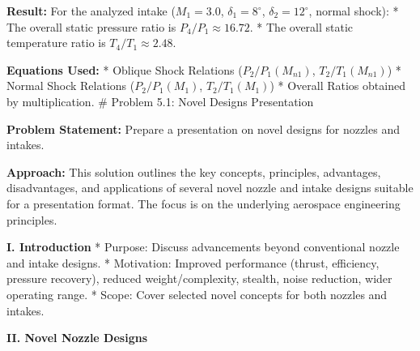 \textbf{Result:} For the analyzed intake (\(M_1=3.0\),
\(\delta_1=8^\circ\), \(\delta_2=12^\circ\), normal shock): * The
overall static pressure ratio is \(P_4/P_1 \approx \mathbf{16.72}\). *
The overall static temperature ratio is
\(T_4/T_1 \approx \mathbf{2.48}\).

\textbf{Equations Used:} * Oblique Shock Relations (\(P_2/P_1(M_{n1})\),
\(T_2/T_1(M_{n1})\)) * Normal Shock Relations (\(P_2/P_1(M_1)\),
\(T_2/T_1(M_1)\)) * Overall Ratios obtained by multiplication. \#
Problem 5.1: Novel Designs Presentation

\textbf{Problem Statement:} Prepare a presentation on novel designs for
nozzles and intakes.

\textbf{Approach:} This solution outlines the key concepts, principles,
advantages, disadvantages, and applications of several novel nozzle and
intake designs suitable for a presentation format. The focus is on the
underlying aerospace engineering principles.

\textbf{I. Introduction} * Purpose: Discuss advancements beyond
conventional nozzle and intake designs. * Motivation: Improved
performance (thrust, efficiency, pressure recovery), reduced
weight/complexity, stealth, noise reduction, wider operating range. *
Scope: Cover selected novel concepts for both nozzles and intakes.

\textbf{II. Novel Nozzle Designs}

